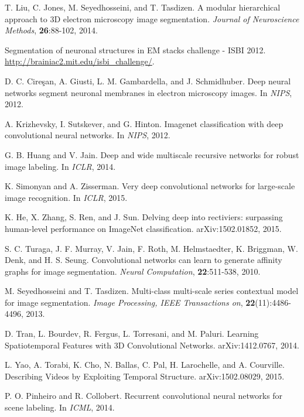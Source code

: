 \documentclass{article} %
\begin{document}
\begin{thebibliography}{9}
{
T. Liu, C. Jones, M. Seyedhosseini, and T. Tasdizen. A modular hierarchical approach to 3D electron microscopy image segmentation. {\it Journal of Neuroscience Methods}, {\bf 26}:88-102, 2014.

Segmentation of neuronal structures in EM stacks challenge - ISBI 2012.
\url{http://brainiac2.mit.edu/isbi_challenge/}.

D. C. Cire\c{s}an, A. Giusti, L. M. Gambardella, and J. Schmidhuber. Deep neural networks segment neuronal membranes in electron microscopy images. In {\it NIPS}, 2012.



A. Krizhevsky, I. Sutskever, and G. Hinton. Imagenet classification with deep convolutional neural networks. In {\it NIPS}, 2012.

G. B. Huang and V. Jain. Deep and wide multiscale recursive networks for robust image labeling. In {\it ICLR}, 2014.

K. Simonyan and A. Zisserman. Very deep convolutional networks for large-scale image recognition. In {\it ICLR}, 2015.

K. He, X. Zhang, S. Ren, and J. Sun. Delving deep into rectiviers: surpassing human-level performance on ImageNet classification. arXiv:1502.01852, 2015.


S. C. Turaga, J. F. Murray, V. Jain, F. Roth, M. Helmstaedter, K. Briggman, W. Denk, and H. S. Seung. Convolutional networks can learn to generate affinity graphs for image segmentation. {\it Neural Computation}, {\bf 22}:511-538, 2010.


M. Seyedhosseini and T. Tasdizen. Multi-class multi-scale series contextual model for image segmentation. {\it Image Processing, IEEE Transactions on}, {\bf 22}(11):4486-4496, 2013.

D. Tran, L. Bourdev, R. Fergus, L. Torresani, and M. Paluri. Learning Spatiotemporal Features with 3D Convolutional Networks. arXiv:1412.0767, 2014.

L. Yao, A. Torabi, K. Cho, N. Ballas, C. Pal, H. Larochelle, and A. Courville. Describing Videos by Exploiting Temporal Structure.
arXiv:1502.08029, 2015.

P. O. Pinheiro and R. Collobert. Recurrent convolutional neural networks for scene labeling. In {\it ICML}, 2014.

}
\end{thebibliography}
\end{document}
